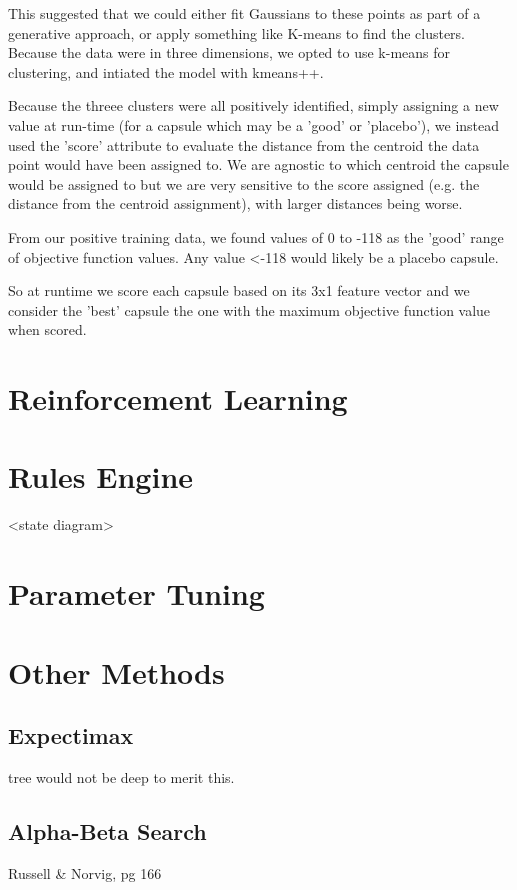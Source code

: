 \documentclass[11pt, oneside]{article}   	%
\begin{document}
This suggested that we could either fit Gaussians to these points as part of a generative approach, or apply something like K-means to find the clusters. Because the data were in three dimensions, we opted to use k-means for clustering, and intiated the model with kmeans++.

Because the threee clusters were all positively identified, simply assigning a new value at run-time (for a capsule which may be a 'good' or 'placebo'), we instead used the 'score' attribute to evaluate the distance from the centroid the data point would have been assigned to. We are agnostic to which centroid the capsule would be assigned to but we are very sensitive to the score assigned (e.g. the distance from the centroid assignment), with larger distances being worse.

From our positive training data, we found values of 0 to -118 as the 'good' range of objective function values. Any value <-118 would likely be a placebo capsule.

So at runtime we score each capsule based on its 3x1 feature vector and we consider the 'best' capsule the one with the maximum objective function value when scored.

\section*{Reinforcement Learning}

\section*{Rules Engine}
<state diagram>

\section*{Parameter Tuning}

\section*{Other Methods}
\subsection*{Expectimax}
tree would not be deep to merit this. 

\subsection*{Alpha-Beta Search}
Russell \& Norvig, pg 166
\end{document}
